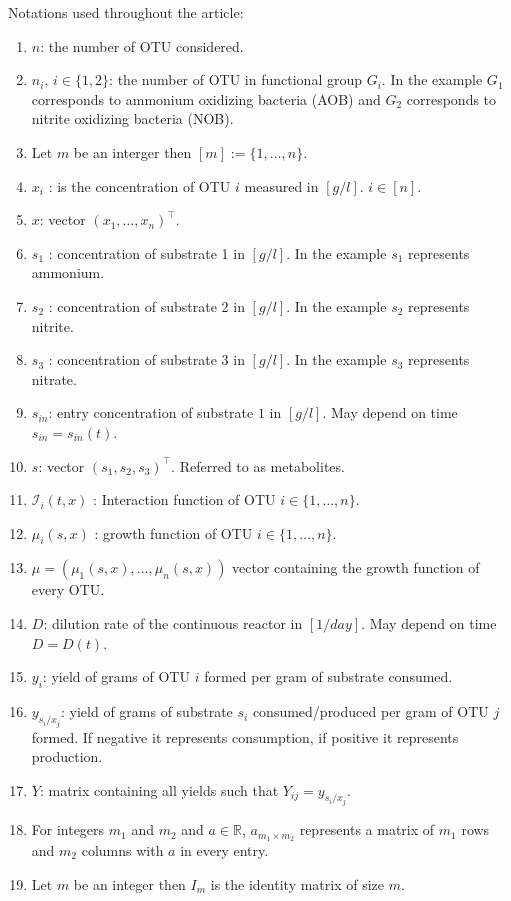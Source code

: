 \documentclass[3p,times]{article}
\newcommand{\R}{\mathbb{R}}
\newcommand{\I}{\mathcal{I}}
\begin{document}
Notations used throughout the article:
\begin{enumerate}
	\item $n$: the number of OTU considered.
	\item $n_i, \, i \in \{1,2\}$: the number of OTU in functional group $G_i$. In the example $G_1$ corresponds to ammonium oxidizing bacteria (AOB) and $G_2$ corresponds to nitrite oxidizing bacteria (NOB).
	\item Let $m$ be an interger then $[m]:=\{1,\dots,n \}$. 
	\item $x_i$ :  is the concentration of OTU $i$ measured in $[g/l]$. $i \in [n]$. 
	\item $x$: vector $(x_1,\dots,x_n)^\top$.
	\item $s_1$ : concentration of substrate 1 in $[g/l]$. In the example $s_1$ represents ammonium.
	\item $s_2$ : concentration of substrate 2 in $[g/l]$. In the example $s_2$ represents nitrite. 
	\item $s_3$ : concentration of substrate 3 in $[g/l]$. In the example $s_3$ represents nitrate.
	\item $s_{in}$: entry concentration of substrate $1$ in $[g/l]$. May depend on time $s_{in} = s_{in}(t)$.
	\item $s$:  vector $(s_1,s_2,s_3)^\top$. Referred to as metabolites.
	\item $\I_i(t,x)$ : Interaction function of OTU $i \in \{1,\dots,n\}$.
	\item $\mu_i(s,x)$ : growth function of OTU $i \in \{1,\dots,n\}$.
	\item $\mu = (\mu_1(s,x), \dots, \mu_n(s,x))$ vector containing the growth function of every OTU.
	\item $D$: dilution rate of the continuous reactor in $[1/day]$. May depend on time $D=D(t)$.
	\item $y_{i}$: yield of grams of OTU $i$ formed per gram of substrate consumed. 
	\item $y_{s_i/x_j}$: yield of grams of substrate $s_i$ consumed/produced per gram of OTU $j$ formed. If negative it represents consumption, if positive it represents production.
	\item $Y$: matrix containing all yields such that $Y_{ij} = y_{s_i/x_j}$.
	\item For integers $m_1$ and $m_2$ and $a \in \R$, $a_{m_1 \times m_2}$ represents a matrix of $m_1$ rows and $m_2$ columns with $a$ in every entry. 
	\item Let $m$ be an integer then $I_m$ is the identity matrix of size $m$.

\end{enumerate}
\end{document}
